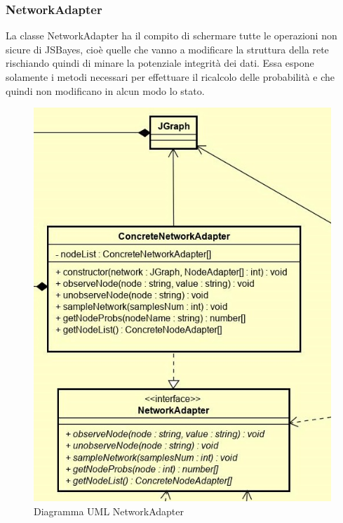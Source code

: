 \subsubsection{NetworkAdapter}
La classe NetworkAdapter ha il compito di schermare tutte le operazioni non sicure di JSBayes, cioè quelle che vanno a modificare la struttura della rete rischiando quindi di minare la potenziale integrità dei dati.
Essa espone solamente i metodi necessari per effettuare il ricalcolo delle probabilità e che quindi non modificano in alcun modo lo stato.
\begin{figure} [H]
	\centering
	\includegraphics[scale=0.7]{Img/NetworkAdapter}
	\caption{Diagramma UML NetworkAdapter}\label{}
\end{figure}
